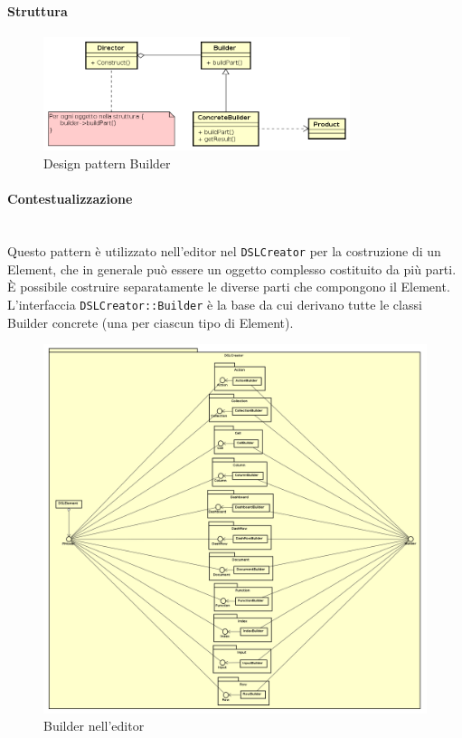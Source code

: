 \paragraph{Struttura}
\begin{figure}[H]
\centering
\includegraphics[width=0.8\textwidth]{res/sections/backend/builder.png}
\caption{Design pattern Builder}
\end{figure}
\paragraph{Contestualizzazione}\mbox{} \\
Questo pattern è utilizzato nell'editor nel  \texttt{DSLCreator} per la costruzione di un  Element, che in generale può essere un oggetto complesso costituito da più parti. È possibile costruire separatamente le diverse parti che compongono il  Element. \\ L'interfaccia \texttt{DSLCreator::Builder} è la base da cui derivano tutte le classi Builder concrete (una per ciascun tipo di  Element).
\begin{figure}[H]
\centering
\includegraphics[width=1.0\textwidth]{res/sections/frontend/builder_editor.png}
\caption{Builder nell'editor}
\end{figure}
